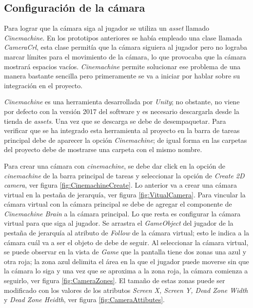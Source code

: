 \subsection{Configuración de la cámara}\label{Cinemachine}
Para lograr que la cámara siga al jugador se utiliza un \textit{asset} llamado
\textit{Cinemachine}. En los prototipos anteriores se había empleado una clase
llamada \textit{CameraCrl}, esta clase permitía que la cámara siguiera al
jugador pero no lograba marcar límites para el movimiento de la cámara, lo que
provocaba que la cámara mostrará espacios vacíos. \textit{Cinemachine} permite
solucionar ese problema de una manera bastante sencilla pero primeramente se va
a iniciar por hablar sobre su integración en el proyecto.
\\
\par
\textit{Cinemachine} es una herramienta desarrollada por \textit{Unity}; no
obstante, no viene por defecto con la versión 2017 del software y es necesario
descargarla desde la tienda de \textit{assets}. Una vez que se descarga se debe
de desempaquetar. Para verificar que se ha integrado esta herramienta al proyecto
en la barra de tareas principal debe de aparecer la opción \textit{Cinemachine};
de igual forma en las carpetas del proyecto debe de mostrarse una carpeta con
el mismo nombre.
\\
\par
Para crear una cámara con \textit{cinemachine}, se debe dar click en la opción de \textit{cinemachine} de la barra principal de tareas y seleccionar la opción de \textit{Create 2D camera}, ver figura \ref{fig:CinemachineCreate}. Lo anterior va a crear una cámara virtual en la pestaña de jerarquía, ver figura \ref{fig:VitualCamera}. Para vincular la cámara virtual con la cámara principal se debe de agregar el componente de \textit{Cinemachine Brain} a la cámara principal. Lo que resta es configurar la cámara virtual para que siga al jugador. Se arrastra el \textit{GameObject} del jugador de la pestaña de jerarquía al atributo de \textit{Follow} de la cámara virtual; esto le indica a la cámara cuál va a ser el objeto de debe de seguir. Al seleccionar la cámara virtual, se puede observar en la vista de \textit{Game} que la pantalla tiene dos zonas una azul y otra roja; la zona azul delimita el área en la que el jugador puede moverse sin que la cámara lo siga y una vez que se aproxima a la zona roja, la cámara comienza a seguirlo, ver figura \ref{fig:CameraZones}. El tamaño de estas zonas puede ser modificado con los valores de los atributos \textit{Screen X, Screen Y, Dead Zone Width} y \textit{Dead Zone Heidth}, ver figura \ref{fig:CameraAttibutes}.
